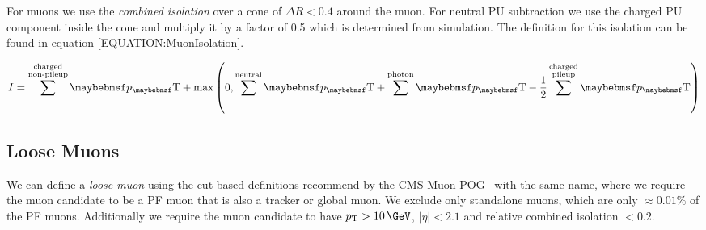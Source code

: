 

For muons we use the \textit{combined isolation} over a cone of $\Delta R < 0.4$ around the muon. For neutral \gls{PU} subtraction we use the charged \gls{PU} component inside the cone and multiply it by a factor of 0.5 which is determined from simulation. The definition for this isolation can be found in equation \ref{EQUATION:MuonIsolation}.

\begin{equation}
I = \sum^{\substack{\text{charged} \\ \text{non-pileup}}}\pT +
\text{max}\left(0,\sum^{\text{neutral}}\pT+\sum^{\text{photon}}\pT-\frac{1}{2}\sum^{\substack{\text{charged}
\\ \text{pileup}}}\pT\right)
\label{EQUATION:MuonIsolation}
\end{equation}


\subsection{Loose Muons}

%


We can define a \textit{loose muon} using the cut-based definitions recommend by the \gls{CMS} Muon \gls{POG}~\cite{ARTICLE:CMSPerformanceOfMuonID7TeV} with the same name, where we require the muon candidate to be a \gls{PF} muon that is also a tracker or global muon. We exclude only standalone muons, which are only $\approx 0.01\%$ of the \gls{PF} muons. Additionally we require the muon candidate to have $\pt>10\,\GeV$, $|\eta|<2.1$ and relative combined isolation $<0.2$.

